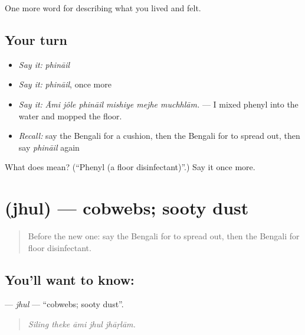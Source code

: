 \begin{grammarlens}[title={What you've built}]
One more word for describing what you lived and felt.
\end{grammarlens}

\subsection*{Your turn}
\begin{itemize}
\raggedright
  \item \emph{Say it:} \emph{phināil}
  \item \emph{Say it:} \emph{phināil}, once more
  \item \emph{Say it:} \emph{Āmi jôle phināil mishiye mejhe muchhlām.} — I mixed phenyl into the water and mopped the floor.
  \item \emph{Recall:} say the Bengali for a cushion, then the Bengali for to spread out, then say \emph{phināil} again
\end{itemize}

\begin{tcolorbox}[breakable,colback=teal!4,colframe=teal!35!black,title={Before you move on}]
What does  mean? (\textquotedblleft{}Phenyl (a floor disinfectant)\textquotedblright{}.) Say it once more.
\end{tcolorbox}
\section[\texorpdfstring{\bn{ঝুল} (jhul)}{ঝুল (jhul)}]{ (jhul) — cobwebs; sooty dust}

\label{lesson:BN-C510-jhul}



\begin{quote}
Before the new one: say the Bengali for to spread out, then the Bengali for floor disinfectant.
\end{quote}

\subsection*{You'll want to know: }
\textbf{} — \emph{jhul} — \textquotedblleft{}cobwebs; sooty dust\textquotedblright{}.

\begin{quote}
    
\end{quote}

\begin{quote}
\emph{Siling theke āmi jhul jhāṛlām.}
\end{quote}


